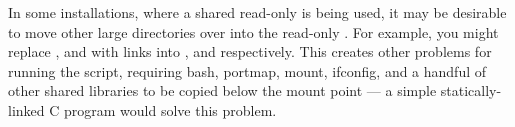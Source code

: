 In some installations, where a shared read-only {} is being
used, it may be desirable to move other large directories over into
the read-only {}. For example, you might replace
{}, {} and {} with links into
{}, {} and
{} respectively. This creates other problems for
running the {} script, requiring bash, portmap, mount,
ifconfig, and a handful of other shared libraries to be copied below
the mount point --- a simple statically-linked C program would solve
this problem.
